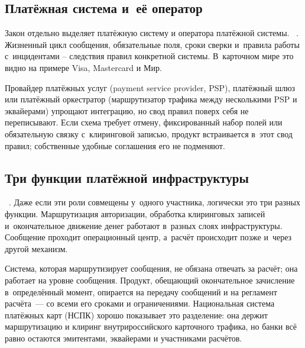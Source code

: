 \subsection*{Платёжная система и~её оператор}

Закон отдельно выделяет платёжную систему и оператора платёжной системы. ~\cite{fz-161}.
Жизненный цикл сообщения, обязательные поля, сроки сверки и~правила работы с~инцидентами -- следствия правил конкретной системы. В~карточном мире это видно на примере Visa, Mastercard и Мир.

Провайдер платёжных услуг (payment service provider, PSP), платёжный шлюз или платёжный оркестратор (маршрутизатор трафика между несколькими PSP и эквайерами) упрощают интеграцию, но свод правил поверх себя не переписывают. Если схема требует отмену, фиксированный набор полей или обязательную связку с~клиринговой записью, продукт встраивается в~этот свод правил; собственные удобные соглашения его не подменяют.

\subsection*{Три функции платёжной инфраструктуры}

~\cite{fz-161}.
Даже если эти роли совмещены у~одного участника, логически это три разных функции. Маршрутизация авторизации, обработка клиринговых записей и~окончательное движение денег работают в~разных слоях инфраструктуры. Сообщение проходит операционный центр, а~расчёт происходит позже и~через другой механизм.

Система, которая маршрутизирует сообщения, не обязана отвечать за расчёт; она работает на уровне сообщения. Продукт, обещающий окончательное зачисление в~определённый момент, опирается на передачу сообщений и на регламент расчёта~--- со всеми его сроками и ограничениями. Национальная система платёжных карт (НСПК) хорошо показывает это разделение: она держит маршрутизацию и клиринг внутрироссийского карточного трафика, но банки всё равно остаются эмитентами, эквайерами и участниками расчётов.

